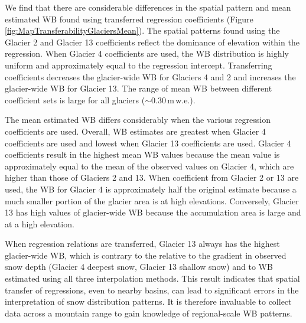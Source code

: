 \documentclass{sfuthesis}
\begin{document}
We find that there are considerable differences in the spatial pattern and mean estimated WB found using transferred regression coefficients (Figure \ref{fig:MapTransferabilityGlaciersMean}). The spatial patterns found using the Glacier 2 and Glacier 13 coefficients reflect the dominance of elevation within the regression. When Glacier 4 coefficients are used, the WB distribution is highly uniform and approximately equal to the regression intercept. Transferring coefficients decreases the glacier-wide WB for Glaciers 4 and 2 and increases the glacier-wide WB for Glacier 13. The range of mean WB between different coefficient sets is large for all glaciers ($\sim$0.30\,m\,w.e.). 

The mean estimated WB differs considerably when the various regression coefficients are used. Overall, WB estimates are greatest when Glacier 4 coefficients are used and lowest when Glacier 13 coefficients are used. Glacier 4 coefficients result in the highest mean WB values because the mean value is approximately equal to the mean of the observed values on Glacier 4, which are higher than those of Glaciers 2 and 13. When coefficient from Glacier 2 or 13 are used, the WB for Glacier 4 is approximately half the original estimate because a much smaller portion of the glacier area is at high elevations. Conversely, Glacier 13 has high values of glacier-wide WB because the accumulation area is large and at a high elevation. 

When regression relations are transferred, Glacier 13 always has the highest glacier-wide WB, which is contrary to the relative to the gradient in observed snow depth (Glacier 4 deepest snow, Glacier 13 shallow snow) and to WB estimated using all three interpolation methods. This result indicates that spatial transfer of regressions, even to nearby basins, can lead to significant errors in the interpretation of snow distribution patterns. It is therefore invaluable to collect data across a mountain range to gain knowledge of regional-scale WB patterns.
\end{document}
